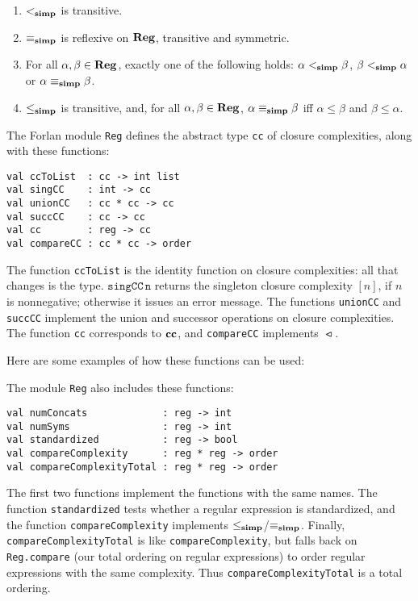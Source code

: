 \begin{proposition}
\begin{enumerate}[\quad(1)]
\item $\mathrel{<_{\mathbf{simp}}}$ is transitive.

\item $\mathrel{\equiv_{\mathbf{simp}}}$ is reflexive on $\mathbf{Reg}$, transitive and symmetric.

\item For all $\alpha,\beta\in\mathbf{Reg}$, exactly one of the following holds:
$\alpha\mathrel{<_{\mathbf{simp}}}\beta$, $\beta\mathrel{<_{\mathbf{simp}}}\alpha$ or $\alpha\mathrel{\equiv_{\mathbf{simp}}}\beta$.

\item $\mathrel{\leq_{\mathbf{simp}}}$ is transitive, and, for all $\alpha,\beta\in\mathbf{Reg}$,
$\alpha\mathrel{\equiv_{\mathbf{simp}}}\beta$ iff $\alpha\leq\beta$ and $\beta\leq\alpha$.
\end{enumerate}
\end{proposition}

The Forlan module \texttt{Reg} defines the abstract type \texttt{cc}
of closure complexities, along with these functions:
\begin{verbatim}
val ccToList  : cc -> int list
val singCC    : int -> cc
val unionCC   : cc * cc -> cc
val succCC    : cc -> cc
val cc        : reg -> cc
val compareCC : cc * cc -> order
\end{verbatim}
The function \texttt{ccToList} is the identity function on closure
complexities: all that changes is the type.  $\mathtt{singCC\,n}$
returns the singleton closure complexity $[n]$, if $n$ is nonnegative;
otherwise it issues an error message.  The functions \texttt{unionCC}
and \texttt{succCC} implement the union and successor operations on
closure complexities.  The function \texttt{cc} corresponds to $\mathbf{cc}$, and
\texttt{compareCC} implements $\ltcc$.

Here are some examples of how these functions can be used:


The module \texttt{Reg} also includes these functions:
\begin{verbatim}
val numConcats             : reg -> int
val numSyms                : reg -> int
val standardized           : reg -> bool
val compareComplexity      : reg * reg -> order
val compareComplexityTotal : reg * reg -> order
\end{verbatim}
%
%
The first two functions implement the functions with the same names.
The function \texttt{standardized} tests whether a regular expression
is standardized, and the function \texttt{compareComplexity} implements
$\mathrel{\leq_{\mathbf{simp}}}$/$\mathrel{\equiv_{\mathbf{simp}}}$. Finally, \texttt{compareComplexityTotal} is like
\texttt{compareComplexity}, but falls back on \texttt{Reg.compare}
(our total ordering on regular expressions) to order regular expressions
with the same complexity.  Thus \texttt{compareComplexityTotal} is
a total ordering.

